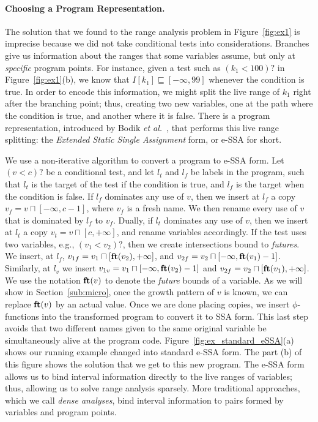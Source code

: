 \documentclass{llncs}
\newcommand{\fun}[1]{\mbox{\textbf{#1}}}
\begin{document}
\paragraph{Choosing a Program Representation.}
The solution that we found to the range analysis problem in Figure~\ref{fig:ex1}
is imprecise because we did not take conditional tests into considerations.
Branches give us information about the ranges that some variables assume, but
only at {\em specific} program points.
For instance, given a test such as $(k_1 < 100)?$ in  Figure~\ref{fig:ex1}(b),
we know that $I[k_1] \sqsubseteq [-\infty, 99]$ whenever the condition is true.
In order to encode this information, we might split the live range of $k_1$
right after the branching point; thus, creating two new variables, one at the
path where the condition is true, and another where it is false.
There is a program representation, introduced by Bodik
{\em et al.}~\cite{Bodik00}, that performs this live range splitting:
the {\em Extended Static Single Assignment} form, or e-SSA for short.

We use a non-iterative algorithm to convert a program to e-SSA form.
Let $(v < c)?$ be a conditional test, and let $l_t$ and $l_f$ be labels in
the program, such that $l_t$ is the target of the test if the condition is true,
and $l_f$ is the target when the condition is false.
If $l_f$ dominates any use of $v$, then we insert at $l_f$ a copy
$v_f = v \sqcap [-\infty, c-1]$, where $v_f$ is a fresh name.
We then rename every use of $v$ that is dominated by $l_f$ to $v_f$.
Dually, if $l_t$ dominates any use of $v$, then we insert at $l_t$ a copy
$v_t = v \sqcap [c, +\infty]$, and rename variables accordingly.
If the test uses two variables, e.g., $(v_1 < v_2)?$, then we create
intersections bound to {\em futures}.
We insert, at $l_f$, $v_{1f} = v_1 \sqcap [\fun{ft}(v_2), +\infty]$,
and $v_{2f} = v_2 \sqcap [-\infty, \fun{ft}(v_1) - 1]$.
Similarly, at $l_v$ we insert
$v_{1v} = v_1 \sqcap [-\infty, \fun{ft}(v_2) - 1]$
and $v_{2f} = v_2 \sqcap [\fun{ft}(v_1), +\infty]$.
We use the notation $\fun{ft}(v)$ to denote the {\em future} bounds of a
variable.
As we will show in Section~\ref{sub:micro}, once the growth pattern of $v$ is
known, we can replace $\fun{ft}(v)$ by an actual value.
Once we are done placing copies, we insert $\phi$-functions into the
transformed program to convert it to SSA form.
This last step avoids that two different names given to the same original
variable be simultaneously alive at the program code.
Figure~\ref{fig:ex_standard_eSSA}(a) shows our running example changed into
standard e-SSA form.
The part (b) of this figure shows the solution that we get to this new
program.
The e-SSA form allows us to bind interval information directly to the live
ranges of variables; thus, allowing us to solve range analysis sparsely.
More traditional approaches, which we call {\em dense analyses}, bind
interval information to pairs formed by variables and program points.
\end{document}
